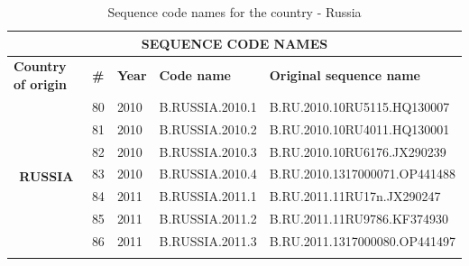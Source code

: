 \begin{table}[htbp]
    \caption{Sequence code names for the country - Russia}
    \centering
\begin{tabular}{|cllll|}
\hline
\multicolumn{5}{|c|}{\textbf{SEQUENCE   CODE NAMES}}                                                                                                                                                                 \\ \hline
\multicolumn{1}{|l|}{\textbf{Country   of origin}}      & \multicolumn{1}{l|}{\textbf{\#}} & \multicolumn{1}{r|}{\textbf{Year}} & \multicolumn{1}{l|}{\textbf{Code name}} & \textbf{Original sequence name}          \\ \hline
\multicolumn{1}{|c|}{\multirow{19}{*}{\textbf{RUSSIA}}} & \multicolumn{1}{l|}{80}          & \multicolumn{1}{l|}{2010}          & \multicolumn{1}{l|}{B.RUSSIA.2010.1}    & B.RU.2010.10RU5115.HQ130007              \\ \cline{2-5} 
\multicolumn{1}{|c|}{}                                  & \multicolumn{1}{l|}{81}          & \multicolumn{1}{l|}{2010}          & \multicolumn{1}{l|}{B.RUSSIA.2010.2}    & B.RU.2010.10RU4011.HQ130001              \\ \cline{2-5} 
\multicolumn{1}{|c|}{}                                  & \multicolumn{1}{l|}{82}          & \multicolumn{1}{l|}{2010}          & \multicolumn{1}{l|}{B.RUSSIA.2010.3}    & B.RU.2010.10RU6176.JX290239              \\ \cline{2-5} 
\multicolumn{1}{|c|}{}                                  & \multicolumn{1}{l|}{83}          & \multicolumn{1}{l|}{2010}          & \multicolumn{1}{l|}{B.RUSSIA.2010.4}    & B.RU.2010.1317000071.OP441488            \\ \cline{2-5} 
\multicolumn{1}{|c|}{}                                  & \multicolumn{1}{l|}{84}          & \multicolumn{1}{l|}{2011}          & \multicolumn{1}{l|}{B.RUSSIA.2011.1}    & B.RU.2011.11RU17n.JX290247               \\ \cline{2-5} 
\multicolumn{1}{|c|}{}                                  & \multicolumn{1}{l|}{85}          & \multicolumn{1}{l|}{2011}          & \multicolumn{1}{l|}{B.RUSSIA.2011.2}    & B.RU.2011.11RU9786.KF374930              \\ \cline{2-5} 
\multicolumn{1}{|c|}{}                                  & \multicolumn{1}{l|}{86}          & \multicolumn{1}{l|}{2011}          & \multicolumn{1}{l|}{B.RUSSIA.2011.3}    & B.RU.2011.1317000080.OP441497            \\ \cline{2-5} 

\end{tabular}
\end{table}
